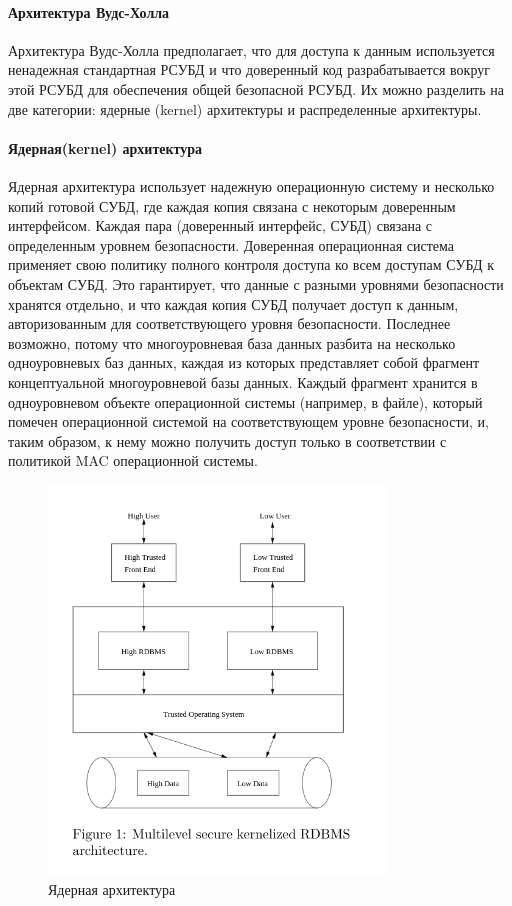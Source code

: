 \paragraph  {Архитектура Вудс-Холла}
Архитектура Вудс-Холла предполагает, что для доступа к данным используется ненадежная стандартная РСУБД
и что доверенный код разрабатывается вокруг этой РСУБД для обеспечения общей безопасной РСУБД.
Их можно разделить на две категории: ядерные (kernel) архитектуры и распределенные архитектуры.
\paragraph{Ядерная(kernel) архитектура}
Ядерная архитектура использует надежную операционную систему и несколько копий готовой СУБД,
где каждая копия связана с некоторым доверенным интерфейсом. Каждая пара (доверенный интерфейс, СУБД)
связана с определенным уровнем безопасности. Доверенная операционная система применяет свою политику
полного контроля доступа ко всем доступам СУБД к объектам СУБД. Это гарантирует, что данные с разными
уровнями безопасности хранятся отдельно, и что каждая копия СУБД получает доступ к данным, авторизованным
для соответствующего уровня безопасности. Последнее возможно, потому что многоуровневая база данных разбита
на несколько одноуровневых баз данных, каждая из которых представляет собой фрагмент
концептуальной многоуровневой базы данных. Каждый фрагмент хранится в одноуровневом объекте операционной
системы (например, в файле), который помечен операционной системой на соответствующем уровне безопасности,
и, таким образом, к нему можно получить доступ только в соответствии с политикой MAC операционной системы.
\begin{figure}[H]
    \centering
    \includegraphics[width=0.8\textwidth]{assets/security/kernel.png}
    \caption{Ядерная архитектура}
    \label{fig:mesh01}
\end{figure}
